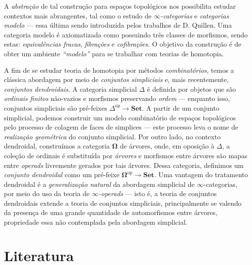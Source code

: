 \documentclass[11pt,reqno]{amsart}
\theoremstyle{definition}
\newcommand{\op}{\mathrm{op}}
\newcommand{\cat}{\mathcal}
\newcommand{\Set}{{\textbf{Set}}}         %
\begin{document}
A \emph{abstração} de tal construção para espaços topológicos nos possibilita
estudar contextos mais abrangentes, tal como o estudo de
\emph{\(\infty\)-categorias} e \emph{categorias modelo} --- essa última sendo
introduzida pelos trabalhos de D. Quillen. Uma categoria modelo é axiomatizada
como possuindo três classes de morfismos, sendo estas: \emph{equivalências
fracas}, \emph{fibrações} e \emph{cofibrações}. O objetivo da construção é de
obter um ambiente \emph{``modelo''} para se trabalhar com teorias de homotopia.

A fim de se estudar teoria de homotopia por métodos \emph{combinatórios}, temos
a clássica abordagem por meio de \emph{conjuntos simpliciais} e, mais
recentemente, \emph{conjuntos dendroidais}. A categoria simplicial \(\Delta\) é
definida por objetos que são \emph{ordinais finitos} não-vazios e morfismos
preservando \emph{ordem} --- enquanto isso, conjuntos simpliciais são pré-feixes
\(\Delta^{\op} \to \Set\). A partir de um conjunto simplicial, podemos construir
um modelo combinatório de espaços topológicos pelo processo de colagem de
faces de simplices --- este processo leva o nome de \emph{realização geométrica}
do conjunto simplicial. Por outro lado, no contexto dendroidal, construímos a
categoria \(\mathbf{\Omega}\) de árvores, onde, em oposição à \(\Delta\), a
coleção de ordinais é substituída por \emph{árvores} e morfismos entre árvores
são mapas entre \emph{operads} livremente gerados por tais árvores. Dessa
categoria, definimos um \emph{conjunto dendroidal} como um pré-feixe
\(\mathbf{\Omega}^{\op} \to \Set\). Uma vantagem do tratamento dendroidal é a
\emph{generalização natural} da abordagem simplicial de \(\infty\)-categorias,
por meio do uso da teoria de \emph{\(\infty\)-operads} --- isto é, a teoria de
conjuntos dendroidais extende a teoria de conjuntos simpliciais, principalmente
se valendo da presença de uma grande quantidade de automorfismos entre árvores,
propriedade essa não contemplada pela abordagem simplicial.

\section{Literatura}
\end{document}
